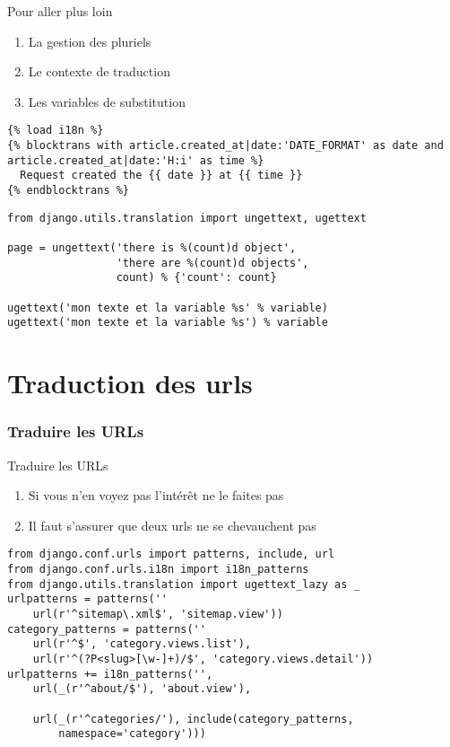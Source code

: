 \documentclass{beamer}
\begin{document}
\begin{frame}[fragile]
  \begin{alertblock}{Pour aller plus loin}
    \begin{enumerate}
      \pause \item La gestion des pluriels
      \pause \item Le contexte de traduction
      \pause \item Les variables de substitution
    \end{enumerate}
  \end{alertblock}
  \pause

  \begin{lstlisting}
{% load i18n %}
{% blocktrans with article.created_at|date:'DATE_FORMAT' as date and article.created_at|date:'H:i' as time %}
  Request created the {{ date }} at {{ time }}
{% endblocktrans %}
  \end{lstlisting}
\pause

  \begin{lstlisting}
from django.utils.translation import ungettext, ugettext

page = ungettext('there is %(count)d object',
                 'there are %(count)d objects',
                 count) % {'count': count}

ugettext('mon texte et la variable %s' % variable)
ugettext('mon texte et la variable %s') % variable
  \end{lstlisting}

\end{frame}

\section{Traduction des urls}

\begin{frame}[fragile]
  \frametitle{Traduire les URLs}

  \begin{alertblock}{Traduire les URLs}
      \begin{enumerate}
         \pause \item Si vous n'en voyez pas l'intérêt ne le faites pas
         \pause \item Il faut s'assurer que deux urls ne se chevauchent pas
      \end{enumerate}
  \end{alertblock}
\pause

  \begin{lstlisting}
from django.conf.urls import patterns, include, url
from django.conf.urls.i18n import i18n_patterns
from django.utils.translation import ugettext_lazy as _
urlpatterns = patterns(''
    url(r'^sitemap\.xml$', 'sitemap.view'))
category_patterns = patterns(''
    url(r'^$', 'category.views.list'),
    url(r'^(?P<slug>[\w-]+)/$', 'category.views.detail'))
urlpatterns += i18n_patterns('',
    url(_(r'^about/$'), 'about.view'),

    url(_(r'^categories/'), include(category_patterns,
        namespace='category')))
  \end{lstlisting}

\end{frame}
\end{document}
